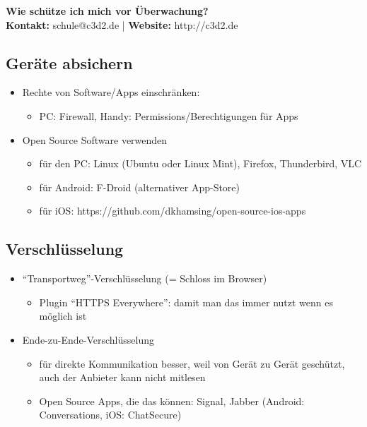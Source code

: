 \documentclass[a5paper]{scrartcl}
\begin{document}


{\Large \textbf{Wie schütze ich mich vor Überwachung?}}\\
\textbf{Kontakt:} schule@c3d2.de | \textbf{Website:} http://c3d2.de
\vspace{2mm}

\subsection*{Geräte absichern}
\begin{itemize}
  \item Rechte von Software/Apps einschränken:
  \begin{itemize}
    \item PC: Firewall, Handy: Permissions/Berechtigungen für Apps
  \end{itemize}
  \item Open Source Software verwenden
  \begin{itemize}
    \item für den PC: Linux (Ubuntu oder Linux Mint), Firefox, Thunderbird, VLC
    \item für Android: F-Droid (alternativer App-Store)
    \item für iOS: https://github.com/dkhamsing/open-source-ios-apps
  \end{itemize}
\end{itemize}
  
\subsection*{Verschlüsselung}
\begin{itemize}
  \item ``Transportweg''-Verschlüsselung (= Schloss im Browser)
  \begin{itemize}
    \item Plugin ``HTTPS Everywhere'': damit man das immer nutzt wenn es möglich ist
  \end{itemize}
  \item Ende-zu-Ende-Verschlüsselung
  \begin{itemize}
    \item für direkte Kommunikation besser, weil von Gerät zu Gerät geschützt, auch der Anbieter kann nicht mitlesen
    \item Open Source Apps, die das können: Signal, Jabber (Android: Conversations, iOS: ChatSecure)
  \end{itemize}
\end{itemize}
\end{document}
